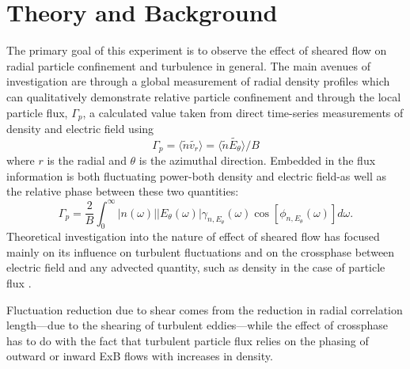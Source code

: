 \documentclass[%
 aip,
 amsmath,amssymb,
 preprint,%
]{revtex4-1}
\begin{document}

\section{Theory and Background}
The primary goal of this experiment is to observe the effect of sheared flow on radial particle confinement and turbulence in general. The main avenues of investigation are through a global measurement of radial density profiles which can qualitatively demonstrate relative particle confinement and through the local particle flux, $\Gamma_{p}$, a calculated value taken from direct time-series measurements of density and electric field using 
\begin{equation}
\Gamma_{p} = \langle \tilde{n} \tilde{v_{r}} \rangle = \langle \tilde{n} \tilde{E_{\theta}} \rangle /B
\label{eq:flux}
\end{equation}
where $r$ is the radial and $\theta$ is the azimuthal direction. Embedded in the flux information is both fluctuating power-both density and electric field-as well as the relative phase between these two quantities: 
\begin{equation}
\Gamma_{p} = \frac{2}{B} \int^{\infty}_{0} \lvert n(\omega) \rvert \lvert E_{\theta}(\omega) \rvert \gamma_{n,E_{\theta}}(\omega) \cos [\phi_{n,E_{\theta}}(\omega)] d\omega.
\label{eq:fluxint}
\end{equation}
Theoretical investigation into the nature of effect of sheared flow has focused mainly on its influence on turbulent fluctuations \cite{biglari90} and on the crossphase between electric field and any advected quantity, such as density in the case of particle flux \cite{ware96,terry01}.  

Fluctuation reduction due to shear comes from the reduction in radial correlation length---due to the shearing of turbulent eddies---while the effect of crossphase has to do with the fact that turbulent particle flux relies on the phasing of outward or inward ExB flows with increases in density.
\end{document}
